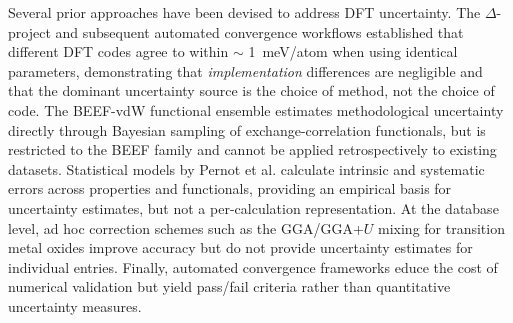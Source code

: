 \documentclass[prb,twocolumn,superscriptaddress,amsmath,amssymb,longbibliography]{revtex4-2}
\newcommand{\meth}{\mathrm{method}}
\begin{document}
Several prior approaches have been devised to address DFT uncertainty. The $\Delta$-project \cite{Lejaeghere2016} and subsequent automated convergence 
workflows \cite{Bosoni2024_ACWF} established that different DFT codes agree to 
within $\sim$ 1~meV/atom when using identical parameters, demonstrating that 
\emph{implementation} differences are negligible and that the dominant 
uncertainty source is the choice of method, not the choice of code. 
The BEEF-vdW functional ensemble \cite{Wellendorff2012,Pandey2015_mBEEF} 
estimates methodological uncertainty directly through Bayesian sampling of 
exchange-correlation functionals, but is restricted to the BEEF family 
and cannot be applied retrospectively to existing datasets. %
Statistical models by Pernot et al. 
 \cite{Pernot2015,Pernot2020,Simm2016} calculate intrinsic and systematic errors across properties and functionals, providing an empirical basis for uncertainty estimates, but not 
a per-calculation representation. 
At the database level, ad hoc correction schemes such as the GGA/GGA+$U$ 
mixing for transition metal 
oxides \cite{Jain2011_GGA_U,Wang2006_oxidation,Hautier2012} improve accuracy but do not provide uncertainty estimates for individual entries. Finally, automated convergence 
frameworks \cite{Huber2020_AiiDA,Wisesa2016,Mathew2017_atomate,Ong2013_pymatgen} 
educe the cost of numerical validation but yield pass/fail criteria rather than quantitative uncertainty measures.
\end{document}
